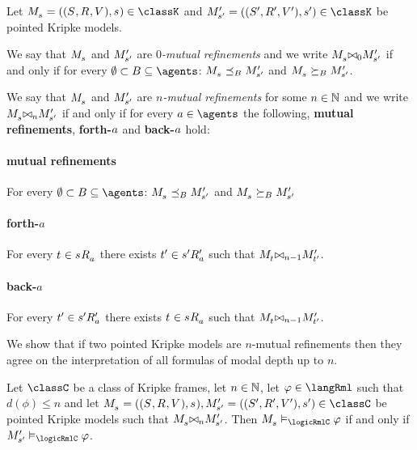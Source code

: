 \begin{definition}
Let $\kPModelAndTuple{\kStateS} \in \classK$ and $\kPModelAndTupleP{\kStateSP} \in \classK$ be pointed Kripke models.

We say that $\kPModel{\kStateS}$ and ${M^{\prime}_{{s}^{\prime}}}$ are {\em $0$-mutual refinements} and we write $\kPModel{\kStateS} \bisimref[0] \kPModelP{\kStateSP}$ if and only if for every $\emptyset \subset \agentsB \subseteq \agents$: $\kPModel{\kStateS} \refinesBs \kPModelP{\kStateSP}$ and $\kPModel{\kStateS} \simulatesBs \kPModelP{\kStateSP}$.

We say that $\kPModel{\kStateS}$ and ${M^{\prime}_{{s}^{\prime}}}$ are {\em $n$-mutual refinements} for some $n \in \mathbb{N}$ and we write $\kPModel{\kStateS} \bisimref[n] \kPModelP{\kStateSP}$ if and only if for every $\agentA \in \agents$ the following, {\bf mutual refinements}, {\bf forth-$a$} and {\bf back-$a$} hold:

\paragraph{mutual refinements} 
For every $\emptyset \subset \agentsB \subseteq \agents$: $\kPModel{\kStateS} \refinesBs \kPModelP{\kStateSP}$ and $\kPModel{\kStateS} \simulatesBs \kPModelP{\kStateSP}$ 

\paragraph{forth-$a$}
For every $\kStateT \in \kStateS \kAccessibility{\agentA}$ there exists ${t}^{\prime} \in {s}^{\prime} {R^{\prime}_{a}}$ such that $\kPModel{\kStateT} \bisimref[n-1] \kPModelP{\kStateTP}$.

\paragraph{back-$a$}
For every ${t}^{\prime} \in {s}^{\prime} {R^{\prime}_{a}}$ there exists $\kStateT \in \kStateS \kAccessibility{\agentA}$ such that $\kPModel{\kStateT} \bisimref[n-1] \kPModelP{\kStateTP}$.
\end{definition}

We show that if two pointed Kripke models are $n$-mutual refinements then they agree on the interpretation of all \langRml{} formulas of modal depth up to $n$.

\begin{lemma}
Let $\classC$ be a class of Kripke frames,
let $n \in \mathbb{N}$,
let $\phi \in \langRml$ such that $d(\phi) \leq n$
and let $\kPModelAndTuple{\kStateS}, \kPModelAndTupleP{\kStateSP} \in \classC$ be pointed Kripke models
such that $\kPModel{\kStateS} \bisimref[n] \kPModelP{\kStateSP}$.
Then $\kPModel{\kStateS} \entails_\logicRmlC \phi$ if and only if $\kPModelP{\kStateSP} \entails_\logicRmlC \phi$.
\end{lemma}

